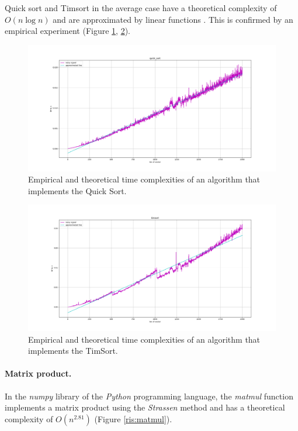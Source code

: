 Quick sort and Timsort in the average case have a theoretical complexity of $O(n\log{n})$ and are approximated by linear functions . This is confirmed by an empirical experiment (Figure \ref{ris:quick_sort}, \ref{ris:timsort}).

\begin{figure}[H]
    \center
    \includegraphics[width=\textwidth]{img/quick_sort.png}
    \caption{Empirical and theoretical time complexities of an algorithm that
implements the Quick Sort.}
    \label{ris:quick_sort}
\end{figure}

\begin{figure}[H]
    \center
    \includegraphics[width=\textwidth]{img/timsort.png}
    \caption{Empirical and theoretical time complexities of an algorithm that implements the TimSort.}
    \label{ris:timsort}
\end{figure}

\paragraph{Matrix product.}

In the \textit{numpy} library of the \textit{Python} programming language, the \textit{matmul} function implements a matrix product using the \textit{Strassen} method and has a theoretical complexity of $O(n^{2.81})$ (Figure \ref{ris:matmul}).


